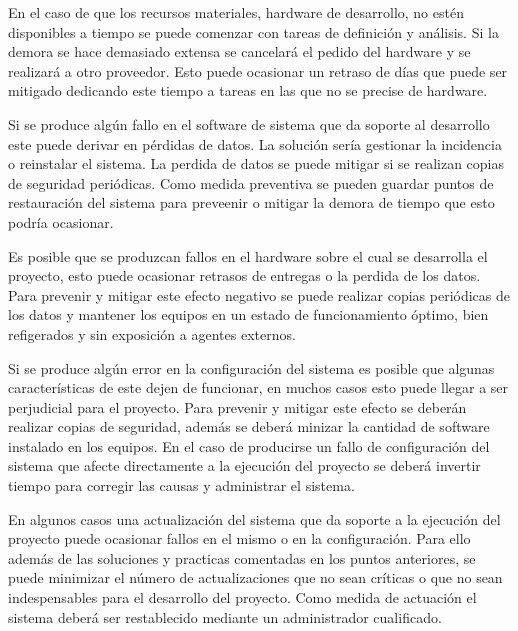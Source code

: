 En el caso de que los recursos materiales, hardware de desarrollo, no estén disponibles a tiempo se puede comenzar con tareas de definición y 
análisis. Si la demora se hace demasiado extensa se cancelará el pedido del hardware y se realizará a otro proveedor. Esto puede ocasionar
un retraso de días que puede ser mitigado dedicando este tiempo a tareas en las que no se precise de hardware. 

Si se produce algún fallo en el software de sistema que da soporte al desarrollo este puede derivar en pérdidas de datos. La solución sería gestionar la incidencia
o reinstalar el sistema. La perdida de datos se puede mitigar si se realizan copias de seguridad periódicas. Como medida preventiva se pueden guardar puntos de restauración del sistema
para preveenir o mitigar la demora de tiempo que esto podría ocasionar.

Es posible que se produzcan fallos en el hardware sobre el cual se desarrolla el proyecto, esto puede ocasionar retrasos de entregas o la perdida de los datos. 
Para prevenir y mitigar este efecto negativo se puede realizar copias periódicas de los datos y mantener los equipos en un estado de funcionamiento óptimo, bien refigerados 
y sin exposición a agentes externos. 

Si se produce algún error en la configuración del sistema es posible que algunas características de este dejen de funcionar, en muchos casos esto puede llegar a ser perjudicial para 
el proyecto. Para prevenir y mitigar este efecto se deberán realizar copias de seguridad, además se deberá minizar la cantidad de software instalado en los equipos. En el caso de producirse un 
fallo de configuración del sistema que afecte directamente a la ejecución del proyecto se deberá invertir tiempo para corregir las causas y administrar el sistema.

En algunos casos una actualización del sistema que da soporte a la ejecución del proyecto puede ocasionar fallos en el mismo o en la configuración. Para ello además de 
las soluciones y practicas comentadas en los puntos anteriores, se puede minimizar el número de actualizaciones que no sean críticas o que no sean indespensables para 
el desarrollo del proyecto. Como medida de actuación el sistema deberá ser restablecido mediante un administrador cualificado. 

